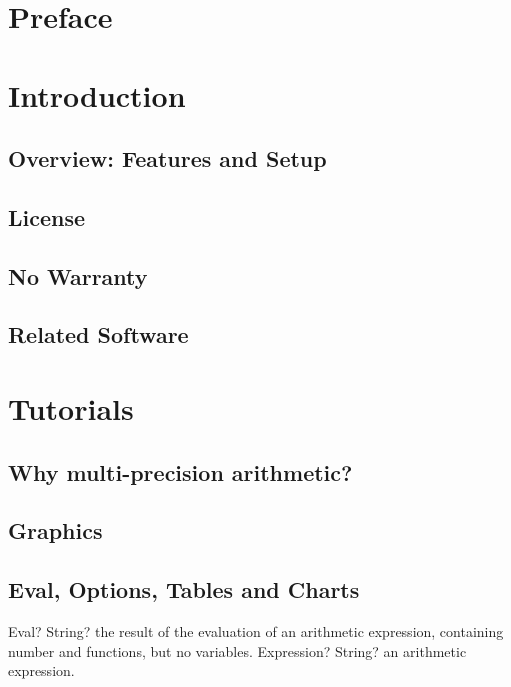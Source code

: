 \documentclass[12pt,a4paper,openany]{book}
\begin{document}
\chapter{Preface}

\chapter{Introduction}

\section{Overview: Features and Setup}

\section{License}

\section{No Warranty}

\section{Related Software}

\chapter{Tutorials}

\section{Why multi-precision arithmetic?}

\section{Graphics}

\section{Eval, Options, Tables and Charts}

\begin{mpFunctionsExtract}
\mpFunctionOne
{Eval? String?  the result of the evaluation of an arithmetic expression, containing number and functions, but no variables.}
{Expression? String? an arithmetic expression.}
\end{mpFunctionsExtract}
\end{document}
